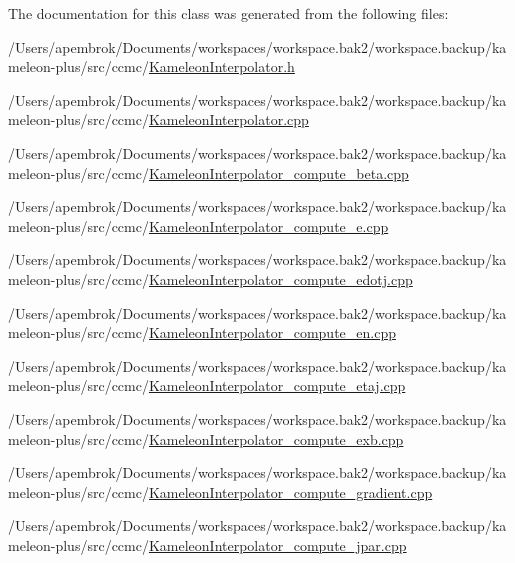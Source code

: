 The documentation for this class was generated from the following files\-:\begin{DoxyCompactItemize}
\item 
/\-Users/apembrok/\-Documents/workspaces/workspace.\-bak2/workspace.\-backup/kameleon-\/plus/src/ccmc/\hyperlink{_kameleon_interpolator_8h}{Kameleon\-Interpolator.\-h}\item 
/\-Users/apembrok/\-Documents/workspaces/workspace.\-bak2/workspace.\-backup/kameleon-\/plus/src/ccmc/\hyperlink{_kameleon_interpolator_8cpp}{Kameleon\-Interpolator.\-cpp}\item 
/\-Users/apembrok/\-Documents/workspaces/workspace.\-bak2/workspace.\-backup/kameleon-\/plus/src/ccmc/\hyperlink{_kameleon_interpolator__compute__beta_8cpp}{Kameleon\-Interpolator\-\_\-compute\-\_\-beta.\-cpp}\item 
/\-Users/apembrok/\-Documents/workspaces/workspace.\-bak2/workspace.\-backup/kameleon-\/plus/src/ccmc/\hyperlink{_kameleon_interpolator__compute__e_8cpp}{Kameleon\-Interpolator\-\_\-compute\-\_\-e.\-cpp}\item 
/\-Users/apembrok/\-Documents/workspaces/workspace.\-bak2/workspace.\-backup/kameleon-\/plus/src/ccmc/\hyperlink{_kameleon_interpolator__compute__edotj_8cpp}{Kameleon\-Interpolator\-\_\-compute\-\_\-edotj.\-cpp}\item 
/\-Users/apembrok/\-Documents/workspaces/workspace.\-bak2/workspace.\-backup/kameleon-\/plus/src/ccmc/\hyperlink{_kameleon_interpolator__compute__en_8cpp}{Kameleon\-Interpolator\-\_\-compute\-\_\-en.\-cpp}\item 
/\-Users/apembrok/\-Documents/workspaces/workspace.\-bak2/workspace.\-backup/kameleon-\/plus/src/ccmc/\hyperlink{_kameleon_interpolator__compute__etaj_8cpp}{Kameleon\-Interpolator\-\_\-compute\-\_\-etaj.\-cpp}\item 
/\-Users/apembrok/\-Documents/workspaces/workspace.\-bak2/workspace.\-backup/kameleon-\/plus/src/ccmc/\hyperlink{_kameleon_interpolator__compute__exb_8cpp}{Kameleon\-Interpolator\-\_\-compute\-\_\-exb.\-cpp}\item 
/\-Users/apembrok/\-Documents/workspaces/workspace.\-bak2/workspace.\-backup/kameleon-\/plus/src/ccmc/\hyperlink{_kameleon_interpolator__compute__gradient_8cpp}{Kameleon\-Interpolator\-\_\-compute\-\_\-gradient.\-cpp}\item 
/\-Users/apembrok/\-Documents/workspaces/workspace.\-bak2/workspace.\-backup/kameleon-\/plus/src/ccmc/\hyperlink{_kameleon_interpolator__compute__jpar_8cpp}{Kameleon\-Interpolator\-\_\-compute\-\_\-jpar.\-cpp}\item 

\end{DoxyCompactItemize}
